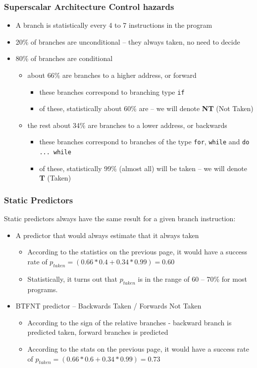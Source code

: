 \documentclass[aspectratio=169]{beamer}
\begin{document}
\begin{frame}
\frametitle{Superscalar Architecture Control hazards}

\begin{itemize}
\item A branch is statistically every 4 to 7 instructions in the program
\item 20\% of branches are unconditional -- they always taken, no need to decide
\item 80\% of branches are conditional
  \begin{itemize}
  \item about 66\% are branches to a higher address, or forward
    \begin{itemize}
    \item these branches correspond to branching type \texttt{if}
    \item of these, statistically about 60\% are  -- we will denote \textbf{NT} (Not Taken)
    \end{itemize}
  \item the rest about 34\% are branches to a lower address, or backwards
    \begin{itemize}
    \item these branches correspond to branches of the type \texttt{for}, \texttt{while} and \texttt{do ... while}
    \item of these, statistically 99\% (almost all) will be taken -- we will denote \textbf{T} (Taken)
    \end{itemize}
  \end{itemize}
\end{itemize}

\end{frame}


\begin{frame}
\frametitle{Static Predictors}

Static predictors always have the same result for a given branch instruction:
\begin{itemize}
\item A predictor that would always estimate that it always taken
\begin{itemize}
\item According to the statistics on the previous page, it would have a success rate of $p_{taken} = (0.66*0.4+0.34*0.99) = 0.60$
\item Statistically, it turns out that $p_{taken}$ is in the range of 60 -- 70\% for most programs.
\end{itemize}
\item BTFNT predictor -- Backwards Taken / Forwards Not Taken
\begin{itemize}
\item According to the sign of the relative branches - backward branch is predicted taken, forward branches is predicted 
\item According to the stats on the previous page, it would have a success rate of $p_{taken} = (0.66*0.6+0.34*0.99) = 0.73$
\end{itemize}
\end{itemize}

\end{frame}
\end{document}
